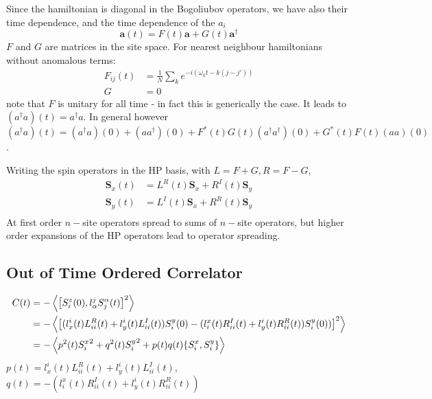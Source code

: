 \documentclass{article}
\let\vec\bm
\begin{document}
Since the hamiltonian is diagonal in the Bogoliubov operators, we have also their time dependence, and the time dependence of the $a_i$
\begin{equation}
    \vec{a}(t) = F(t) \vec{a} + G(t) \vec{a}^\dagger
\end{equation}
$F$ and $G$ are matrices in the site space. 
For nearest neighbour hamiltonians without anomalous terms: 
\begin{align}
    F_{ij}(t)&= \frac{1}{N} \sum_k e^{-i(\omega_k t - k(j-j'))}\\
    G &= 0
\end{align}
note that $F$ is unitary for all time - in fact this is generically the case. 
It leads to $(a^\dagger a)(t) = a^\dagger a$. 
In general however $(a^\dagger a)(t) = (a^\dagger a)(0)+(aa^\dagger)(0)+F^*(t)G(t)(a^\dagger a^\dagger)(0) + G^*(t)F(t)(a a)(0)$.

Writing the spin operators in the HP basis, with $L = F+G, R=F-G$,
\begin{align}
    \vec{S}_x(t) &= L^R(t)\vec{S}_x + R^I(t)\vec{S}_y\\
    \vec{S}_y(t) &= L^I(t)\vec{S}_x + R^R(t)\vec{S}_y\\
\end{align}
At first order $n-$site operators spread to sums of $n-$site operators, but higher order expansions of the HP operators lead to operator spreading.
%
\subsection{Out of Time Ordered Correlator}
%
\begin{align}
    C(t) &= -\ev{\comm{S_i^z(0)}{l^j_\alpha S_j^\alpha(t)}^2}\\
         &= -\ev{\left[(l^i_x(t) L^R_{ii}(t)+ l^i_y(t) L^I_{ii}(t)) S_i^y(0)-(l_i^x(t)R^I_{ii}(t) + l^i_y(t) R^R_{ii}(t))S_i^y(0))\right]^2}\\
         &= -\ev{p^2(t){S_i^x}^2+q^2(t){S_i^y}^2 + p(t)q(t)\acomm{S_i^x}{S_i^y}}
\end{align}
$p(t) = l^i_x(t) L^R_{ii}(t)+ l^i_y(t) L^I_{ii}(t)$, $q(t) =-(l_i^x(t)R^I_{ii}(t) + l^i_y(t) R^R_{ii}(t))$



\end{document}
